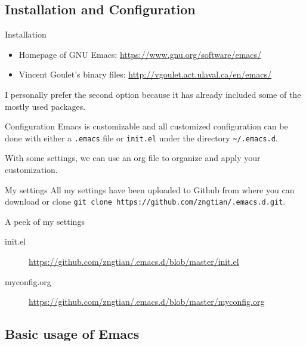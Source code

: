 \documentclass[presentation]{beamer}
\begin{document}
\subsection{Installation and Configuration}
\label{sec:orgdeb3de5}

\begin{frame}[label={sec:org455445e}]{Installation}
\begin{itemize}
\item Homepage of GNU Emacs: \url{https://www.gnu.org/software/emacs/}

\item Vincent Goulet's binary files:
\url{http://vgoulet.act.ulaval.ca/en/emacs/}
\end{itemize}

\begin{NOTES}
I personally prefer the second option because it has already included
some of the mostly used packages.
\end{NOTES}
\end{frame}

\begin{frame}[fragile,label={sec:org9b9a0e8}]{Configuration}
 Emacs is customizable and all customized configuration can be done
with either a \texttt{.emacs} file or \texttt{init.el} under the directory
\texttt{\textasciitilde{}/.emacs.d}.

With some settings, we can use an org file to organize and apply your
customization.
\end{frame}

\begin{frame}[fragile,label={sec:org809527c}]{My settings}
 All my settings have been uploaded to Github from where you can
download or clone \texttt{git clone
https://github.com/zngtian/.emacs.d.git}.

\begin{block}{A peek of my settings}
\begin{description}
\item[{init.el}] \url{https://github.com/zngtian/.emacs.d/blob/master/init.el}
\item[{myconfig.org}] \url{https://github.com/zngtian/.emacs.d/blob/master/myconfig.org}
\end{description}
\end{block}
\end{frame}


\subsection{Basic usage of Emacs}
\label{sec:orgc5d6454}
\end{document}

